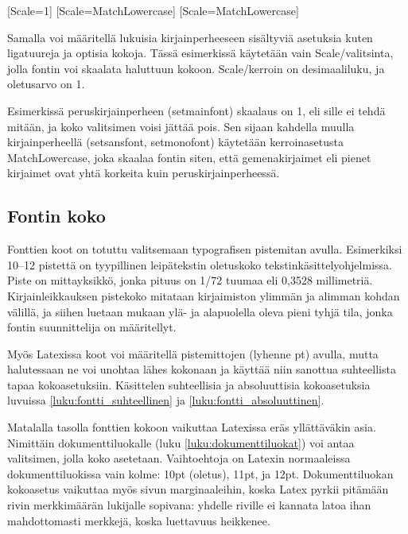 \documentclass[a4paper,10pt,notitlepage,oneside]{book}
\newcommand{\koodi}[1]{\textsf{#1}}
\begin{document}
\begin{koodilohkosis}
  \usepackage{fontspec}
  \setmainfont{Linux Libertine O}[Scale=1]
  \setsansfont{Linux Biolinum O}[Scale=MatchLowercase]
  \setmonofont{Linux Libertine Mono O}[Scale=MatchLowercase]
\end{koodilohkosis}

Samalla voi määritellä lukuisia kirjainperheeseen sisältyviä asetuksia
kuten ligatuureja ja optisia kokoja. Tässä esimerkissä käytetään vain
\koodi{Scale}\-/valitsinta, jolla fontin voi skaalata haluttuun kokoon.
\koodi{Scale}\-/kerroin on desimaaliluku, ja oletus\-arvo on 1.

Esimerkissä peruskirjainperheen (\koodi{set\-main\-font}) skaalaus on 1,
eli sille ei tehdä mitään, ja koko valitsimen voisi jättää pois. Sen
sijaan kahdella muulla kirjainperheellä (\koodi{set\-sans\-font,
  set\-mono\-font}) käytetään ker\-roin\-ase\-tus\-ta
\koodi{Match\-Lower\-case}, joka skaalaa fontin siten, että
gemenakirjaimet eli pienet kirjaimet ovat yhtä korkeita kuin
peruskirjainperheessä.

\subsection{Fontin koko}

Fonttien koot on totuttu valitsemaan typo\-grafisen pistemitan avulla.
Esimerkiksi 10--12 pistettä on tyypillinen leipätekstin oletuskoko
teks\-tin\-kä\-sit\-tely\-ohjel\-mis\-sa. Piste on mitta\-yksikkö, jonka
pituus on 1/72 tuumaa eli 0,3528 millimetriä. Kirjainleikkauksen
pistekoko mitataan kirjaimiston ylimmän ja alimman kohdan välillä, ja
siihen luetaan mukaan ylä- ja alapuolella oleva pieni tyhjä tila, jonka
fontin suunnittelija on määritellyt.

Myös Latexissa koot voi määritellä pistemittojen (lyhenne pt) avulla,
mutta halutessaan ne voi unohtaa lähes kokonaan ja käyttää niin sanottua
suhteellista tapaa koko\-asetuksiin. Käsittelen suhteellisia ja
absoluuttisia koko\-ase\-tuk\-sia luvuissa
\ref{luku:fontti_suhteellinen} ja \ref{luku:fontti_absoluuttinen}.

Matalalla tasolla fonttien kokoon vaikuttaa Latexissa eräs yllättäväkin
asia. Nimittäin dokumenttiluokalle (luku \ref{luku:dokumenttiluokat})
voi antaa valitsimen, jolla koko asetetaan. Vaihto\-ehtoja on Latexin
normaaleissa dokumenttiluokissa vain kolme: \koodi{10pt} (oletus),
\koodi{11pt}, ja \koodi{12pt}. Dokumenttiluokan koko\-asetus vaikuttaa
myös sivun marginaaleihin, koska Latex pyrkii pitämään rivin
merkkimäärän lukijalle sopivana: yhdelle riville ei kannata latoa ihan
mahdottomasti merkkejä, koska luettavuus heikkenee.
\end{document}
